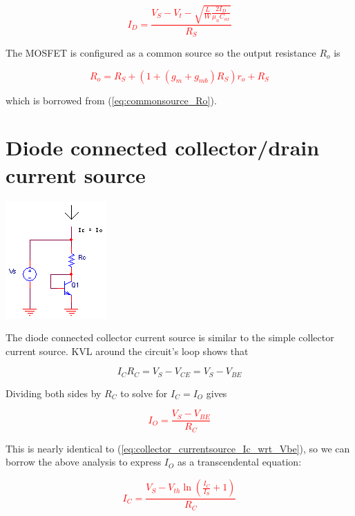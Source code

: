 \textcolor{red}{
\begin{equation}
I_{D} = \frac{V_{S}-V_{t}-\sqrt{\frac{L}{W}\frac{2I_{D}}{\mu_{n}C_{ox}}}}{R_{S}}
\end{equation}
}

The MOSFET is configured as a common source so the output resistance $R_{o}$ is

\textcolor{red}{
\begin{equation}
R_{o} = R_{S} + (1+(g_{m}+g_{mb})R_{S})r_{o}+R_{S}
\end{equation}
}

\noindent which is borrowed from (\ref{eq:commonsource_Ro}).

\section{Diode connected collector/drain current source}
\begin{center}
	\includegraphics{schematics/diodeconnected_collector_currentsource.PNG}
\end{center}
The diode connected collector current source is similar to the simple collector current source. KVL around the circuit's loop shows that

\begin{equation}
I_{C}R_{C} = V_{S} - V_{CE} = V_{S} - V_{BE}
\end{equation}

\noindent Dividing both sides by $R_{C}$ to solve for $I_{C} = I_{O}$ gives

\textcolor{red}{
\begin{equation}
I_{O} = \frac{V_{S}-V_{BE}}{R_{C}}
\end{equation}
}

\noindent This is nearly identical to (\ref{eq:collector_currentsource_Ic_wrt_Vbe}), so we can borrow the above analysis to express $I_{O}$ as a transcendental equation:

\textcolor{red}{
\begin{equation}
I_{C} = \frac{V_{S}-V_{th}\ln\left(\frac{I_{C}}{I_{S}}+1\right)}{R_{C}}
\end{equation}
}

